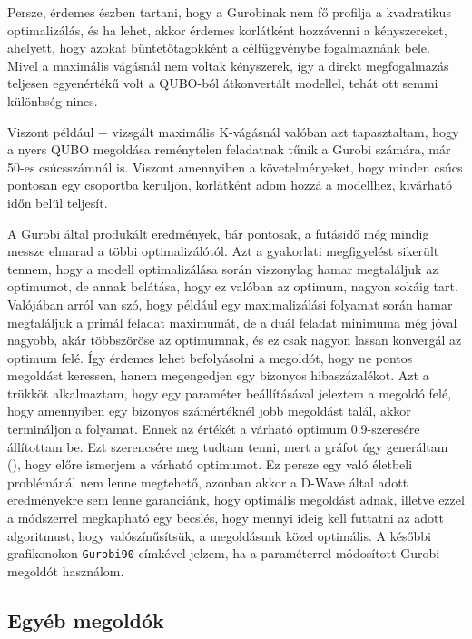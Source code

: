 Persze, érdemes észben tartani, hogy a Gurobinak nem fő profilja a kvadratikus optimalizálás, és ha lehet, akkor érdemes korlátként hozzávenni a kényszereket, ahelyett, hogy azokat büntetőtagokként a célfüggvénybe fogalmaznánk bele. Mivel a maximális vágásnál nem voltak kényszerek, így a direkt megfogalmazás teljesen egyenértékű volt a QUBO-ból átkonvertált modellel, tehát ott semmi különbség nincs.

Viszont például \az+ vizsgált maximális K-vágásnál valóban azt tapasztaltam, hogy a nyers QUBO megoldása reménytelen feladatnak tűnik a Gurobi számára, már 50-es csúcsszámnál is. Viszont amennyiben a követelményeket, hogy minden csúcs pontosan egy csoportba kerüljön, korlátként adom hozzá a modellhez, kivárható időn belül teljesít.

A Gurobi által produkált eredmények, bár pontosak, a futásidő még mindig messze elmarad a többi optimalizálótól. Azt a gyakorlati megfigyelést sikerült tennem, hogy a modell optimalizálása során viszonylag hamar megtaláljuk az optimumot, de annak belátása, hogy ez valóban az optimum, nagyon sokáig tart. 
Valójában arról van szó, hogy például egy maximalizálási folyamat során hamar megtaláljuk a primál feladat maximumát, de a duál feladat minimuma még jóval nagyobb, akár többszöröse az optimumnak, és ez csak nagyon lassan konvergál az optimum felé. Így érdemes lehet befolyásolni a megoldót, hogy ne pontos megoldást keressen, hanem megengedjen egy bizonyos hibaszázalékot. Azt a trükköt alkalmaztam, hogy egy paraméter beállításával jeleztem a megoldó felé, hogy amennyiben egy bizonyos számértéknél jobb megoldást talál, akkor termináljon a folyamat\cite{gurobiBestObjStop}. Ennek az értékét a várható optimum 0.9-szeresére állítottam be. Ezt szerencsére meg tudtam tenni, mert a gráfot úgy generáltam (), hogy előre ismerjem a várható optimumot. Ez persze egy való életbeli problémánál nem lenne megtehető, azonban akkor a D-Wave által adott eredményekre sem lenne garanciánk, hogy optimális megoldást adnak, illetve ezzel a módszerrel megkapható egy becslés, hogy mennyi ideig kell futtatni az adott algoritmust, hogy valószínűsítsük, a megoldásunk közel optimális. A későbbi grafikonokon \verb+Gurobi90+ címkével jelzem, ha a paraméterrel módosított Gurobi megoldót használom.

\subsection{Egyéb megoldók}\label{sec:practiceOthers}

